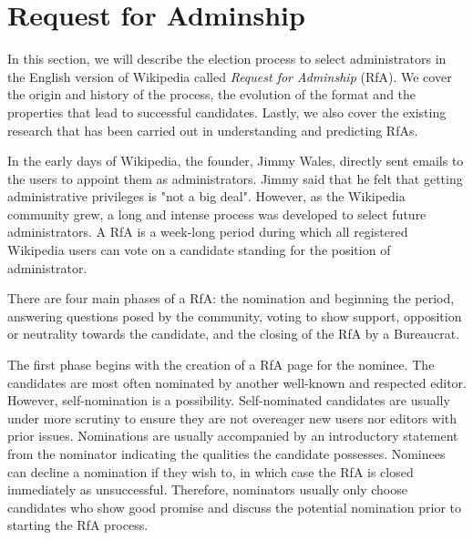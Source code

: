 \section{Request for Adminship}
\label{sec:rfa}
In this section, we will describe the election process to select administrators in the English version of Wikipedia called \textit{Request for Adminship} (RfA).
We cover the origin and history of the process, the evolution of the format and the properties that lead to successful candidates.
Lastly, we also cover the existing research that has been carried out in understanding and predicting RfAs.

In the early days of Wikipedia, the founder, Jimmy Wales, directly sent emails to the users to appoint them as administrators.
Jimmy said that he felt that getting administrative privileges is "not a big deal".
However, as the Wikipedia community grew, a long and intense process was developed to select future administrators.
A RfA is a week-long period during which all registered Wikipedia users can vote on a candidate standing for the position of administrator. 

There are four main phases of a RfA: the nomination and beginning the period, answering questions posed by the community, voting to show support, opposition or neutrality towards the candidate, and the closing of the RfA by a Bureaucrat.

The first phase begins with the creation of a RfA page for the nominee.
The candidates are most often nominated by another well-known and respected editor.
However, self-nomination is a possibility.
Self-nominated candidates are usually under more scrutiny to ensure they are not overeager new users nor editors with prior issues.
Nominations are usually accompanied by an introductory statement from the nominator indicating the qualities the candidate possesses.
Nominees can decline a nomination if they wish to, in which case the RfA is closed immediately as unsuccessful.
Therefore, nominators usually only choose candidates who show good promise and discuss the potential nomination prior to starting the RfA process. 

